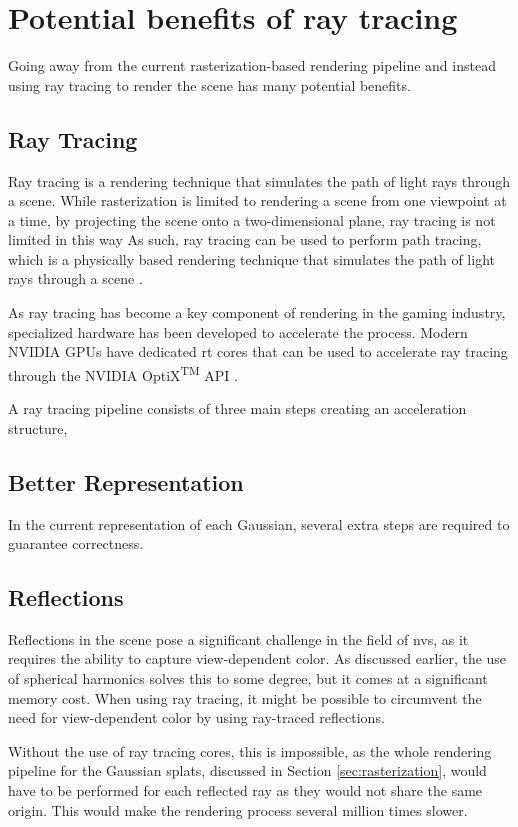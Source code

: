 \section{Potential benefits of ray tracing}
Going away from the current rasterization-based rendering pipeline and instead using ray tracing to render the scene has many potential benefits.

\subsection{Ray Tracing}
Ray tracing is a rendering technique that simulates the path of light rays through a scene.
While rasterization is limited to rendering a scene from one viewpoint at a time, by projecting the scene onto a two-dimensional plane, ray tracing is not limited in this way \cite{caulfieldWhatPathTracing2022}
As such, ray tracing can be used to perform path tracing, which is a physically based rendering technique that simulates the path of light rays through a scene \cite{caulfieldWhatPathTracing2022}.

As ray tracing has become a key component of rendering in the gaming industry, specialized hardware has been developed to accelerate the process.
Modern NVIDIA GPUs have dedicated \gls{rt} cores that can be used to accelerate ray tracing through the NVIDIA OptiX\textsuperscript{TM} API \cite{nvidiaNVIDIAOptiXProgramming2023}.

A ray tracing pipeline consists of three main steps creating an acceleration structure,


\subsection{Better Representation}
In the current representation of each Gaussian, several extra steps are required to guarantee correctness.

\subsection{Reflections}
Reflections in the scene pose a significant challenge in the field of \gls{nvs}, as it requires the ability to capture view-dependent color.
As discussed earlier, the use of spherical harmonics solves this to some degree, but it comes at a significant memory cost.
When using ray tracing, it might be possible to circumvent the need for view-dependent color by using ray-traced reflections.

Without the use of ray tracing cores, this is impossible, as the whole rendering pipeline for the Gaussian splats, discussed in Section \ref{sec:rasterization}, would have to be performed for each reflected ray as they would not share the same origin.
This would make the rendering process several million times slower.

